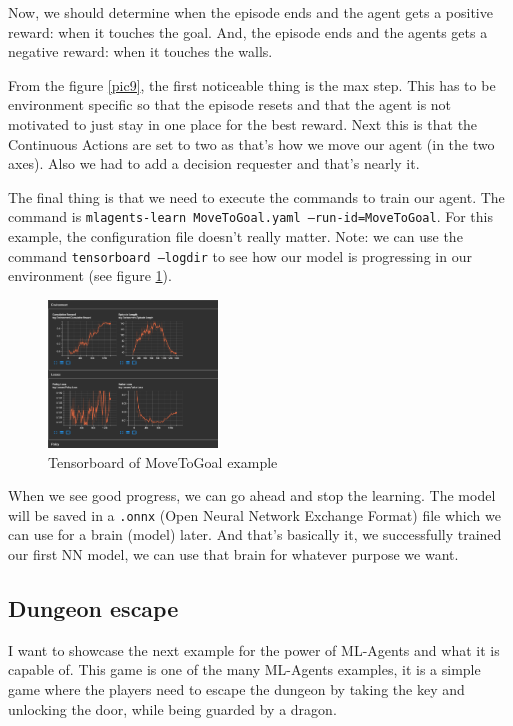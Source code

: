 \documentclass[a4paper, 12pt]{book}
\begin{document}
Now, we should determine when the episode ends and the agent gets a positive reward: when it touches the goal. 
And, the episode ends and the agents gets a negative reward: when it touches the walls.

From the figure \ref{pic9}, the first noticeable thing is the max step. This has to be environment specific so that the episode resets and that the agent is not motivated to just stay in one place for the best reward. Next this is that the Continuous Actions are set to two as that's how we move our agent (in the two axes). Also we had to add a decision requester and that's nearly it.

The final thing is that we need to execute the commands to train our agent.  The command is \texttt{mlagents-learn MoveToGoal.yaml --run-id=MoveToGoal}. For this example, the configuration file doesn't really matter. Note: we can use the command \texttt{tensorboard --logdir} to see how our model is progressing in our environment (see figure \ref{pic10}).

\begin{figure}[ht]
\begin{center}
\includegraphics[width=0.4\textwidth]{Images/tensorboard.png}
\end{center}
\caption{Tensorboard of MoveToGoal example}
\label{pic10}
\end{figure}

When we see good progress, we can go ahead and stop the learning. The model will be saved in a \texttt{.onnx} (Open Neural Network Exchange Format) file which we can use for a brain (model) later. And that's basically it, we successfully trained our first NN model, we can use that brain for whatever purpose we want.

\subsection{Dungeon escape}

I want to showcase the next example for the power of ML-Agents and what it is capable of. This game is one of the many ML-Agents \cite{MLAgents} examples, it is a simple game where the players need to escape the dungeon by taking the key and unlocking the door, while being guarded by a dragon.
\end{document}
